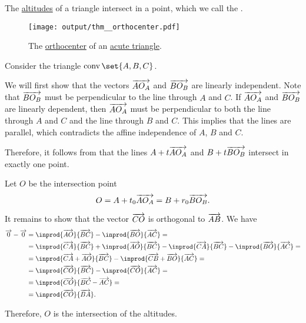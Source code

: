 \begin{proposition}\label{thm:orthocenter}\mimprovised
  The \hyperref[def:triangle_altitude]{altitudes} of a triangle intersect in a point, which we call the .

  \begin{figure}[!ht]
    \centering
    \texttt{[image: output/thm\_\_orthocenter.pdf]}
    \caption{The \hyperref[thm:orthocenter]{orthocenter} of an \hyperref[def:triangle/measure/acute]{acute triangle}.}\label{fig:thm:orthocenter}
  \end{figure}
\end{proposition}
\begin{defproof}
  Consider the triangle \( \conv\set{ A, B, C } \).

  We will first show that the vectors \( \overrightarrow{A O_A} \) and \( \overrightarrow{B O_B} \) are linearly independent. Note that \( \overrightarrow{B O_B} \) must be perpendicular to the line through \( A \) and \( C \). If \( \overrightarrow{A O_A} \) and \( \overrightarrow{B O_B} \) are linearly dependent, then  \( \overrightarrow{A O_A} \) must be perpendicular to both the line through \( A \) and \( C \) and the line through \( B \) and \( C \). This implies that the lines are parallel, which contradicts the affine independence of \( A \), \( B \) and \( C \).

  Therefore, it follows from  that the lines \( A + t \overrightarrow{A O_A} \) and \( B + t \overrightarrow{B O_B} \) intersect in exactly one point.

  Let \( O \) be the intersection point
  \begin{equation*}
    O = A + t_0 \overrightarrow{A O_A} = B + r_0 \overrightarrow{B O_B}.
  \end{equation*}

  It remains to show that the vector \( \overrightarrow{CO} \) is orthogonal to \( \overrightarrow{AB} \). We have
  \begin{align*}
    \vect 0 - \vect 0
    &=
    \inprod {\vect{AO}} {\vect{BC}} - \inprod {\vect{BO}} {\vect{AC}}
    = \\ &=
    \inprod {\vect{CA}} {\vect{BC}} + \inprod {\vect{AO}} {\vect{BC}} - \inprod {\vect{CA}} {\vect{BC}} - \inprod {\vect{BO}} {\vect{AC}}
    = \\ &=
    \inprod {\vect{CA} + \vect{AO}} {\vect{BC}} - \inprod {\vect{CB} + \vect{BO}} {\vect{AC}}
    = \\ &=
    \inprod {\vect{CO}} {\vect{BC}} - \inprod {\vect{CO}} {\vect{AC}}
    = \\ &=
    \inprod {\vect{CO}} {\vect{BC} - \vect{AC}}
    = \\ &=
    \inprod {\vect{CO}} {\vect{BA}}.
  \end{align*}

  Therefore, \( O \) is the intersection of the altitudes.
\end{defproof}


